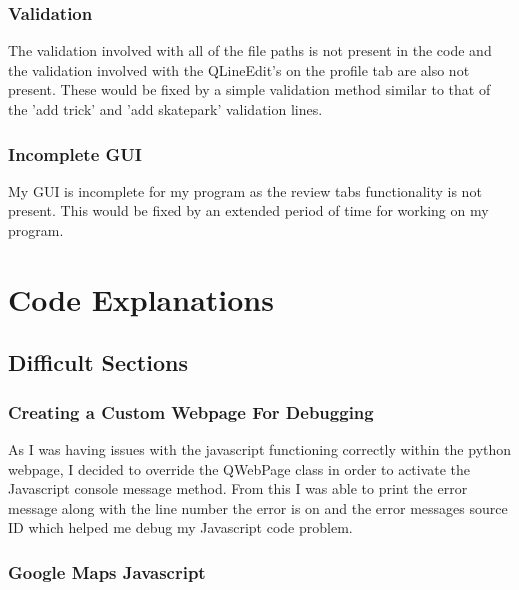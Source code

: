 \subsubsection{Validation}

The validation involved with all of the file paths is not present in the code and the validation involved with the QLineEdit's on the profile tab are also not present. These would be fixed by a simple validation method similar to that of the 'add trick' and 'add skatepark' validation lines.

\subsubsection{Incomplete GUI}

My GUI is incomplete for my program as the review tabs functionality is not present. This would be fixed by an extended period of time for working on my program.









\section{Code Explanations}

\subsection{Difficult Sections}

\subsubsection{Creating a Custom Webpage For Debugging}


As I was having issues with the javascript functioning correctly within the python webpage, I decided to override the QWebPage class in order to activate the Javascript console message method. From this I was able to print the error message along with the line number the error is on and the error messages source ID which helped me debug my Javascript code problem.

\subsubsection{Google Maps Javascript}

